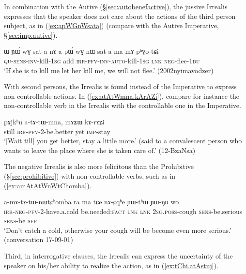 In combination with the Autive (§\ref{sec:autobenefactive}), the jussive Irrealis expresses that the speaker does not care about the actions of the third person subject, as in (\ref{ex:apWGnWsata}) (compare with the Autive Imperative, §\ref{sec:imp.autive}).

\begin{exe}
\ex \label{ex:apWGnWsata}
\gll ɯ-ɲɯ́-wɣ-sat-a nɤ a-pɯ́-wɣ-nɯ-sat-a ma mɤ-pʰɣo-tɕi \\
\textsc{qu}-\textsc{sens}-\textsc{inv}-kill-\textsc{1sg} add \textsc{irr}-\textsc{pfv}-\textsc{inv}-\textsc{auto}-kill-\textsc{1sg} \textsc{lnk} \textsc{neg}-flee-\textsc{1du} \\
\glt `If she is to kill me let her kill me, we will not flee.' (2002nyimavodzer)
\end{exe}

With second persons, the Irrealis is found instead of the Imperative to express non-controllable actions. In (\ref{ex:atAtWmna.kArAZi}), compare for instance the non-controllable verb  in the Irrealis with the controllable one  in the Imperative.

\begin{exe}
\ex \label{ex:atAtWmna.kArAZi}
\gll pɤjkʰu a-tɤ-tɯ-mna, mɤʑɯ kɤ-rɤʑi \\
still \textsc{irr}-\textsc{pfv}-2-be.better yet \textsc{imp}-stay \\
\glt `[Wait till] you get better, stay a little more.' (said to a convalescent person who wants to leave the place where she is taken care of.'  (12-BzaNsa) 
\end{exe} 

The negative Irrealis is also more felicitous than the Prohibitive (§\ref{sec:prohibitive}) with non-controllable verbs, such as  in (\ref{ex:amAtAtWnWtChomba}).

\begin{exe}
\ex \label{ex:amAtAtWnWtChomba}
\gll a-mɤ-tɤ-tɯ-nɯtɕʰomba ra ma tɕe nɤ-ɕqʰe ɲɯ-tʰɯ ɲɯ-ŋu wo \\
\textsc{irr}-\textsc{neg}-\textsc{pfv}-2-have.a.cold be.needed:\textsc{fact} \textsc{lnk} \textsc{lnk} \textsc{2sg}.\textsc{poss}-cough \textsc{sens}-be.serious \textsc{sens}-be \textsc{sfp} \\
\glt `Don't catch a cold, otherwise your cough will be become even more serious.' (conversation 17-09-01)
\end{exe}

Third, in interrogative clauses, the Irrealis can express the uncertainty of the speaker on his/her ability to realize the action,  as in (\ref{ex:tChi.atAstuj}).

